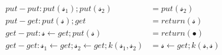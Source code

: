 \begin{align*}
  put-put : put(𝓈_1) ; put(𝓈_2) &= put (𝓈_2)                        \\
  put-get : put(𝓈) ; get &= return(𝓈)                               \\
  get-put : 𝓈 ← get ; put(𝓈) &= return(∙)                           \\
  get-get : 𝓈_1 ← get ; 𝓈_2 ← get ; k(𝓈_1,𝓈_2) &= 𝓈 ← get ; k(𝓈,𝓈)
\end{align*}
